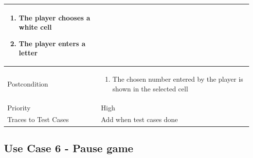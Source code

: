 \documentclass[12pt]{article}
\begin{document}
\begin{center}
\begin{tabular}{ |p{3.4cm}|p{10cm}| }
    \begin{enumerate}[leftmargin=0.2in]
        \item The player chooses a white cell 
        \item The player enters a letter
    \end{enumerate}  \\
    \hline
   Postcondition & 
    \vspace*{-0.1in}
    \begin{enumerate}[leftmargin=0.2in]
        \item The chosen number entered by the player is shown in the selected cell 
    \end{enumerate} \\
    \hline
    Priority & High  \\
    \hline
    \small{Traces to Test Cases} & Add when test cases done  \\
    \hline
\end{tabular}
\end{center}

\newpage


\subsection{Use Case 6 - Pause game}
\end{document}
